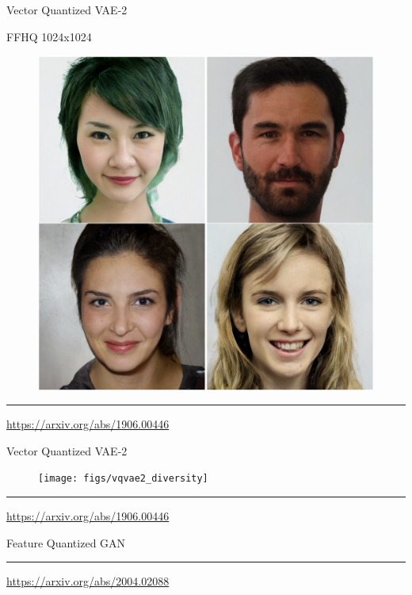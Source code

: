 \documentclass{beamer}
\begin{document}
\begin{frame}{Vector Quantized VAE-2}
	\begin{block}{FFHQ 1024x1024}
	\begin{figure}
		\centering
		\includegraphics[width=0.63\linewidth]{figs/vqvae2_faces}
	\end{figure}
	\end{block}
	\vfill
	\hrule\medskip
	{\scriptsize \href{https://arxiv.org/abs/1906.00446}{https://arxiv.org/abs/1906.00446}} 
\end{frame}
\begin{frame}{Vector Quantized VAE-2}
	\begin{figure}
		\centering
		\texttt{[image: figs/vqvae2\_diversity]}
	\end{figure}
	\vfill
	\hrule\medskip
	{\scriptsize \href{https://arxiv.org/abs/1906.00446}{https://arxiv.org/abs/1906.00446}} 
\end{frame}
\begin{frame}{Feature Quantized GAN}
	\vfill
	\hrule\medskip
	{\scriptsize \href{https://arxiv.org/abs/2004.02088}{https://arxiv.org/abs/2004.02088}} 
\end{frame}
\end{document}
